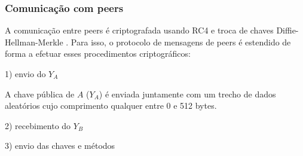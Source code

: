 
\subsubsection*{Comunicação com peers}

A comunicação entre \glspl*{peer} é criptografada usando RC4 e troca de chaves
Diffie-Hellman-Merkle \cite{wikivuze:encription}. Para isso, o protocolo de mensagens
de \glspl*{peer} é estendido de forma a efetuar esses procedimentos criptográficos:


1) envio do $Y_A$

A chave pública de $A$ ($Y_A$) é enviada juntamente com um trecho de dados aleatórios
cujo comprimento qualquer entre 0 e 512 bytes.


2) recebimento do $Y_B$


3) envio das chaves e métodos



